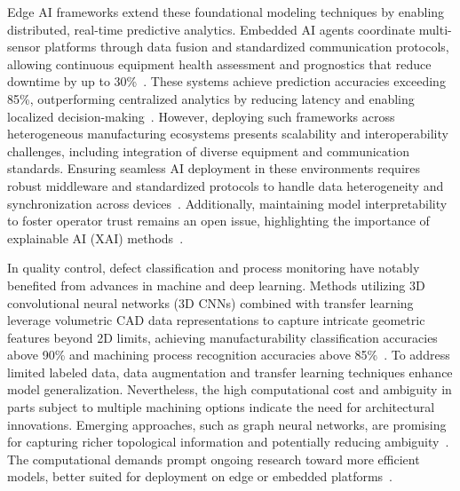 \documentclass[sigconf]{acmart}
\begin{document}
Edge AI frameworks extend these foundational modeling techniques by enabling distributed, real-time predictive analytics. Embedded AI agents coordinate multi-sensor platforms through data fusion and standardized communication protocols, allowing continuous equipment health assessment and prognostics that reduce downtime by up to 30\%~\cite{ref35,ref36}. These systems achieve prediction accuracies exceeding 85\%, outperforming centralized analytics by reducing latency and enabling localized decision-making~\cite{ref35}. However, deploying such frameworks across heterogeneous manufacturing ecosystems presents scalability and interoperability challenges, including integration of diverse equipment and communication standards. Ensuring seamless AI deployment in these environments requires robust middleware and standardized protocols to handle data heterogeneity and synchronization across devices~\cite{ref38,ref36}. Additionally, maintaining model interpretability to foster operator trust remains an open issue, highlighting the importance of explainable AI (XAI) methods~\cite{ref38}.

In quality control, defect classification and process monitoring have notably benefited from advances in machine and deep learning. Methods utilizing 3D convolutional neural networks (3D CNNs) combined with transfer learning leverage volumetric CAD data representations to capture intricate geometric features beyond 2D limits, achieving manufacturability classification accuracies above 90\% and machining process recognition accuracies above 85\%~\cite{ref39,ref40}. To address limited labeled data, data augmentation and transfer learning techniques enhance model generalization. Nevertheless, the high computational cost and ambiguity in parts subject to multiple machining options indicate the need for architectural innovations. Emerging approaches, such as graph neural networks, are promising for capturing richer topological information and potentially reducing ambiguity~\cite{ref39}. The computational demands prompt ongoing research toward more efficient models, better suited for deployment on edge or embedded platforms~\cite{ref40}.
\end{document}
